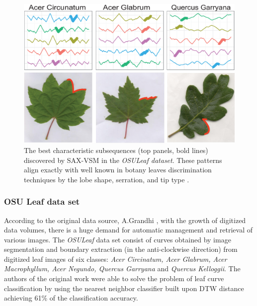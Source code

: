 \begin{figure}[!h]
   \centering
   \includegraphics[width=130mm]{figures/AcerCircunatum.eps}
   \caption{The best characteristic subsequences (top panels, bold lines) discovered by SAX-VSM in
    the \textit{OSULeaf dataset}. These patterns align exactly with well known in botany leaves discrimination techniques
    by the lobe shape, serration, and tip type \cite{citeulike:12134192}.}
   \label{fig:shapelet-acer-patterns}
\end{figure}

\subsubsection{OSU Leaf data set}
According to the original data source, A.Grandhi \cite{citeulike:12563798}, with the growth of digitized data 
volumes, there is a huge demand for automatic management and retrieval of various images. 
The \textit{OSULeaf} data set consist of curves obtained by image segmentation and boundary
extraction (in the anti-clockwise direction) from digitized leaf images of six classes: \textit{Acer Circinatum, 
Acer Glabrum, Acer Macrophyllum, Acer Negundo, Quercus Garryana} and \textit{Quercus Kelloggii}.
The authors of the original work were able to solve the problem of leaf curve classification by using 
the nearest neighbor classifier built upon DTW distance achieving 61\% of the classification accuracy. 

